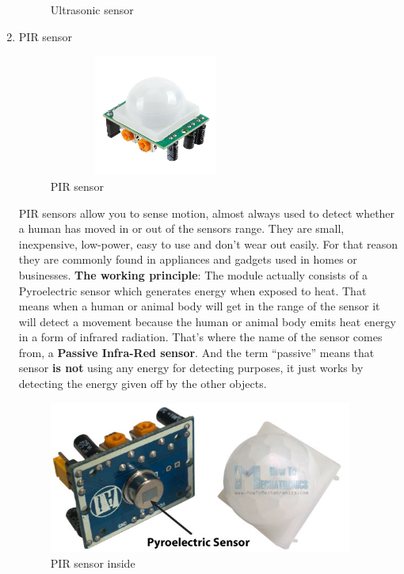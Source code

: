 \begin{enumerate}
\begin{figure}[H]
            \caption{Ultrasonic sensor}
            \label{Fig:ultrasonic}
        \end{figure}
		\item PIR sensor
		 \vspace{0mm}
		 \begin{figure}[H]
		 	\centering
		 	\includegraphics[width=7cm,height=4cm]{figures/PIR}
		 	\caption{PIR sensor}
		 	\label{Fig:PIR sensor}
		 \end{figure}
		 \vspace{0mm}
		 PIR sensors allow you to sense motion, almost always used to detect whether a human has moved in or out of the sensors range. 
		 They are small, inexpensive, low-power, easy to use and don't wear out easily.
		 For that reason they are commonly found in appliances and gadgets used in homes or businesses. 
		 \textbf{The working principle}: The module actually consists of a Pyroelectric sensor which generates energy when exposed to heat.
		 That means when a human or animal body will get in the range of the sensor it will detect a movement because the human or animal body emits heat energy in a form of infrared radiation. That’s where the name of the sensor comes from, a \textbf{Passive Infra-Red sensor}. And the term “passive” means that sensor \textbf{is not} using any energy for detecting purposes, it just works by detecting the energy given off by the other objects.
		 \vspace{0mm}
		 \begin{figure}[H]
		 	\centering
		 	\includegraphics[width=10cm,height=5cm]{figures/PIR2}
		 	\caption{PIR sensor inside}
		 	\label{Fig:PIR sensor}

\end{figure}
\end{enumerate}
